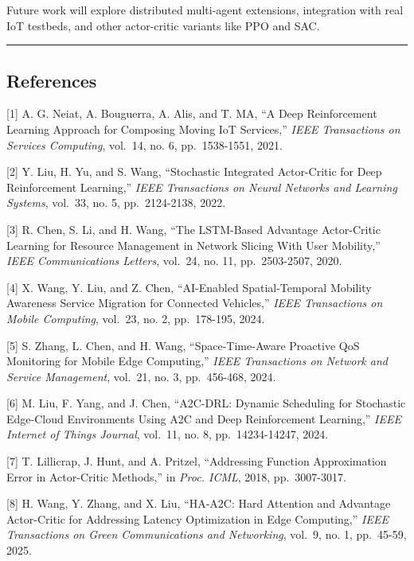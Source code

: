 \documentclass[
  10pt,
  twocolumn,
]{article}
\begin{document}
Future work will explore distributed multi-agent extensions, integration
with real IoT testbeds, and other actor-critic variants like PPO and
SAC.

\begin{center}\rule{0.5\linewidth}{0.5pt}\end{center}

\hypertarget{references}{%
\subsection{References}\label{references}}

{[}1{]} A. G. Neiat, A. Bouguerra, A. Alis, and T. MA, ``A Deep
Reinforcement Learning Approach for Composing Moving IoT Services,''
\emph{IEEE Transactions on Services Computing}, vol.~14, no. 6,
pp.~1538-1551, 2021.

{[}2{]} Y. Liu, H. Yu, and S. Wang, ``Stochastic Integrated Actor-Critic
for Deep Reinforcement Learning,'' \emph{IEEE Transactions on Neural
	Networks and Learning Systems}, vol.~33, no. 5, pp.~2124-2138, 2022.

{[}3{]} R. Chen, S. Li, and H. Wang, ``The LSTM-Based Advantage
Actor-Critic Learning for Resource Management in Network Slicing With
User Mobility,'' \emph{IEEE Communications Letters}, vol.~24, no. 11,
pp.~2503-2507, 2020.

{[}4{]} X. Wang, Y. Liu, and Z. Chen, ``AI-Enabled Spatial-Temporal
Mobility Awareness Service Migration for Connected Vehicles,''
\emph{IEEE Transactions on Mobile Computing}, vol.~23, no. 2,
pp.~178-195, 2024.

{[}5{]} S. Zhang, L. Chen, and H. Wang, ``Space-Time-Aware Proactive QoS
Monitoring for Mobile Edge Computing,'' \emph{IEEE Transactions on
	Network and Service Management}, vol.~21, no. 3, pp.~456-468, 2024.

{[}6{]} M. Liu, F. Yang, and J. Chen, ``A2C-DRL: Dynamic Scheduling for
Stochastic Edge-Cloud Environments Using A2C and Deep Reinforcement
Learning,'' \emph{IEEE Internet of Things Journal}, vol.~11, no. 8,
pp.~14234-14247, 2024.

{[}7{]} T. Lillicrap, J. Hunt, and A. Pritzel, ``Addressing Function
Approximation Error in Actor-Critic Methods,'' in \emph{Proc. ICML},
2018, pp.~3007-3017.

{[}8{]} H. Wang, Y. Zhang, and X. Liu, ``HA-A2C: Hard Attention and
Advantage Actor-Critic for Addressing Latency Optimization in Edge
Computing,'' \emph{IEEE Transactions on Green Communications and
	Networking}, vol.~9, no. 1, pp.~45-59, 2025.
\end{document}
